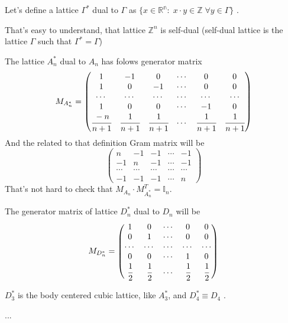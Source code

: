 \documentclass[a4paper, 12pt]{article}
\begin{document}
\par Let's define a lattice $\Gamma^*$ dual to $\Gamma$ as $\{x\in\mathbb{R^n} :\; x\cdot y\in\mathbb{Z} \; \forall y\in\Gamma\}$ \cite{ebeling}.
\par That's easy to understand, that lattice $\mathbb{Z}^n$ is self-dual (self-dual lattice is the lattice $\Gamma$ such that $\Gamma^* = \Gamma$)
\par The lattice $A_n^*$ dual to $A_n$ has folows generator matrix
$$
M_{A_n^*} = 
\begin{pmatrix}
	1 & -1 & 0 & \cdots & 0 & 0 \\
	1 & 0 & -1 & \cdots & 0 & 0 \\
	\cdots & \cdots & \cdots & \cdots & \cdots & \cdots \\
	1 & 0 & 0 & \cdots & -1 & 0 \\
	\cfrac{-n}{n+1} & \cfrac{1}{n+1} & \cfrac{1}{n+1} & \cdots & \cfrac{1}{n+1} & \cfrac{1}{n+1}
\end{pmatrix}
$$
And the related to that definition Gram matrix will be
$$
\begin{pmatrix}
	n & -1 & -1 & \cdots & -1 \\
	-1 & n & -1 & \cdots & -1 \\
	\cdots & \cdots & \cdots & \cdots & \cdots \\
	-1 & -1 & -1 & \cdots & n
\end{pmatrix}
$$
That's not hard to check that $M_{A_n}\cdot M_{A_n^*}^T = \mathbb{I}_n$.
\par The generator matrix of lattice $D_n^*$ dual to $D_n$ will be
$$
M_{D_n^*} = 
\begin{pmatrix}
1 & 0 & \cdots & 0 & 0 \\
0 & 1 & \cdots & 0 & 0 \\
\cdots & \cdots & \cdots & \cdots & \cdots \\
0 & 0 & \cdots & 1 & 0 \\
\cfrac{1}{2} & \cfrac{1}{2} & \cdots & \cfrac{1}{2} & \cfrac{1}{2} 
\end{pmatrix}
$$
\par $D_3^*$ is the body centered cubic lattice, like $A_3^*$, and $D_4^* \equiv D_4$ \cite{conway}.
\par ... %
\end{document}
